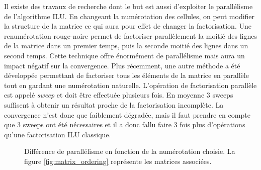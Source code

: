 Il existe des travaux de recherche dont le but est aussi d'exploiter le parallélisme de l'algorithme ILU.
%
En changeant la numérotation des cellules, on peut modifier la structure de la matrice ce qui aura pour effet de changer la factorisation.
%
Une renumérotation rouge-noire permet de factoriser parallèlement la moitié des lignes de la matrice dans un premier temps, puis la seconde moitié des lignes dans un second temps.
%
Cette technique offre énormément de parallélisme mais aura un impact négatif sur la convergence\cite{red_black_ilu}.
%
Plus récemment, une autre méthode a été développée permettant de factoriser tous les éléments de la matrice en parallèle tout en gardant une numérotation naturelle.
%
L'opération de factorisation parallèle est appelé {\em sweep} et doit être effectuée plusieurs fois\cite{chow2014fine}.
%
En moyenne 3 sweeps suffisent à obtenir un résultat proche de la factorisation incomplète.
%
La convergence n'est donc que faiblement dégradée, mais il faut prendre en compte que 3 sweeps ont été nécessaires et il a donc fallu faire 3 fois plus d'opérations qu'une factorisation ILU classique.

\begin{figure}[!ht]
     \begin{center}
    \end{center}
    \caption{Différence de parallélisme en fonction de la numérotation choisie. La figure \ref{fig:matrix_ordering} représente les matrices associées.}
    \label{fig:DAG_ordering}
\end{figure}
